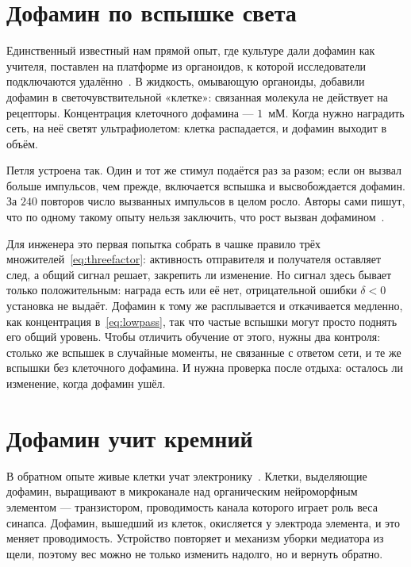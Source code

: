 \section{Дофамин по вспышке света}
\label{sec:dishdopamine}

Единственный известный нам прямой опыт, где культуре дали дофамин как учителя, поставлен на платформе из органоидов, к которой исследователи подключаются удалённо~\cite{Jordan2024}. В жидкость, омывающую органоиды, добавили дофамин в светочувствительной «клетке»: связанная молекула не действует на рецепторы. Концентрация клеточного дофамина --- $1$~мМ. Когда нужно наградить сеть, на неё светят ультрафиолетом: клетка распадается, и дофамин выходит в объём.

Петля устроена так. Один и тот же стимул подаётся раз за разом; если он вызвал больше импульсов, чем прежде, включается вспышка и высвобождается дофамин. За $240$ повторов число вызванных импульсов в целом росло. Авторы сами пишут, что по одному такому опыту нельзя заключить, что рост вызван дофамином~\cite{Jordan2024}.

Для инженера это первая попытка собрать в чашке правило трёх множителей~\eqref{eq:threefactor}: активность отправителя и получателя оставляет след, а общий сигнал решает, закрепить ли изменение. Но сигнал здесь бывает только положительным: награда есть или её нет, отрицательной ошибки $\delta<0$ установка не выдаёт. Дофамин к тому же расплывается и откачивается медленно, как концентрация в~\eqref{eq:lowpass}, так что частые вспышки могут просто поднять его общий уровень. Чтобы отличить обучение от этого, нужны два контроля: столько же вспышек в случайные моменты, не связанные с ответом сети, и те же вспышки без клеточного дофамина. И нужна проверка после отдыха: осталось ли изменение, когда дофамин ушёл.

\section{Дофамин учит кремний}
\label{sec:biohybrid}

В обратном опыте живые клетки учат электронику~\cite{Keene2020}. Клетки, выделяющие дофамин, выращивают в микроканале над органическим нейроморфным элементом --- транзистором, проводимость канала которого играет роль веса синапса. Дофамин, вышедший из клеток, окисляется у электрода элемента, и это меняет проводимость. Устройство повторяет и механизм уборки медиатора из щели, поэтому вес можно не только изменить надолго, но и вернуть обратно.

